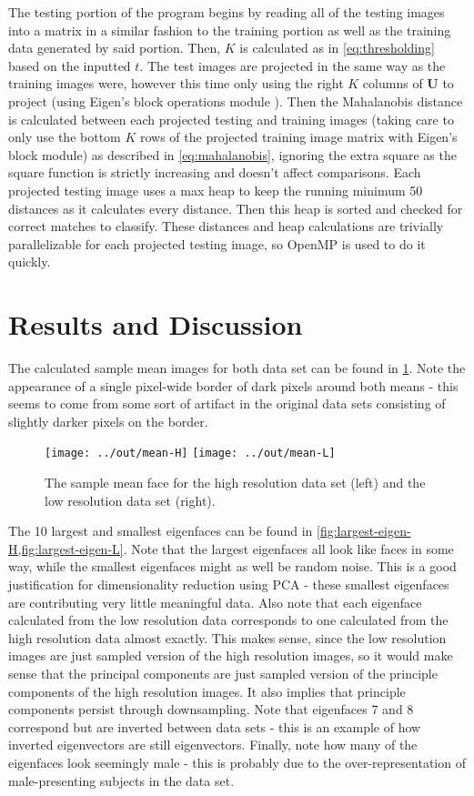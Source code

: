 \documentclass[headings=optiontoheadandtoc,listof=totoc,parskip=full]{scrartcl}
\begin{document}
The testing portion of the program begins by reading all of the testing images into a matrix in a similar fashion to the training portion as well as the training data generated by said portion. Then, $K$ is calculated as in \cref{eq:thresholding} based on the inputted $t$. The test images are projected in the same way as the training images were, however this time only using the right $K$ columns of $\mathbf U$ to project (using Eigen's block operations module \autocite{eigenBlock}). Then the Mahalanobis distance is calculated between each projected testing and training images (taking care to only use the bottom $K$ rows of the projected training image matrix with Eigen's block module) as described in \cref{eq:mahalanobis}, ignoring the extra square as the square function is strictly increasing and doesn't affect comparisons. Each projected testing image uses a max heap to keep the running minimum 50 distances as it calculates every distance. Then this heap is sorted and checked for correct matches to classify. These distances and heap calculations are trivially parallelizable for each projected testing image, so OpenMP is used to do it quickly.

\section{Results and Discussion}
\label{sec:results}

The calculated sample mean images for both data set can be found in \cref{fig:sample-means}. Note the appearance of a single pixel-wide border of dark pixels around both means - this seems to come from some sort of artifact in the original data sets consisting of slightly darker pixels on the border.

\begin{figure}[H]
	\centering
	\texttt{[image: ../out/mean-H]} \qquad
	\texttt{[image: ../out/mean-L]}
	\caption{The sample mean face for the high resolution data set (left) and the low resolution data set (right).}
	\label{fig:sample-means}
\end{figure}

The 10 largest and smallest eigenfaces can be found in \cref{fig:largest-eigen-H,fig:largest-eigen-L}. Note that the largest eigenfaces all look like faces in some way, while the smallest eigenfaces might as well be random noise. This is a good justification for dimensionality reduction using PCA - these smallest eigenfaces are contributing very little meaningful data. Also note that each eigenface calculated from the low resolution data corresponds to one calculated from the high resolution data almost exactly. This makes sense, since the low resolution images are just sampled version of the high resolution images, so it would make sense that the principal components are just sampled version of the principle components of the high resolution images. It also implies that principle components persist through downsampling. Note that eigenfaces 7 and 8 correspond but are inverted between data sets - this is an example of how inverted eigenvectors are still eigenvectors. Finally, note how many of the eigenfaces look seemingly male - this is probably due to the over-representation of male-presenting subjects in the data set.
\end{document}
